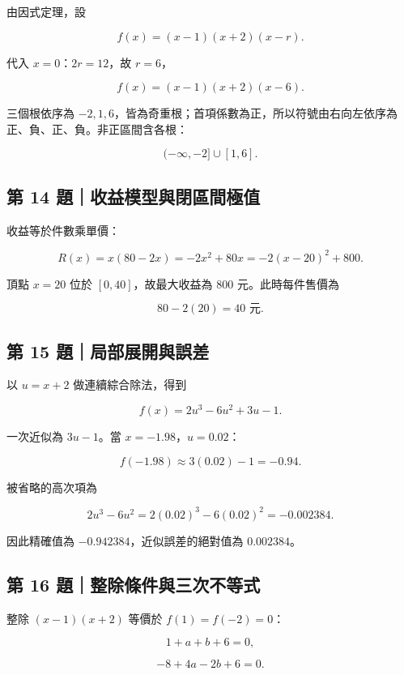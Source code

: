 \documentclass[11pt,a4paper]{article}
\begin{document}
由因式定理，設

\[
f(x)=(x-1)(x+2)(x-r).
\]

代入 \(x=0\)：\(2r=12\)，故 \(r=6\)，

\[
\boxed{f(x)=(x-1)(x+2)(x-6)}.
\]

三個根依序為 \(-2,1,6\)，皆為奇重根；首項係數為正，所以符號由右向左依序為正、負、正、負。非正區間含各根：

\[
\boxed{(-\infty,-2]\cup[1,6]}.
\]

\subsection{第 14 題｜收益模型與閉區間極值}\label{ux7b2c-14-ux984cux6536ux76caux6a21ux578bux8207ux9589ux5340ux9593ux6975ux503c}

收益等於件數乘單價：

\[
R(x)=x(80-2x)=-2x^2+80x=-2(x-20)^2+800.
\]

頂點 \(x=20\) 位於 \([0,40]\)，故最大收益為 \(\boxed{800}\) 元。此時每件售價為

\[
80-2(20)=\boxed{40}\text{ 元}.
\]

\subsection{第 15 題｜局部展開與誤差}\label{ux7b2c-15-ux984cux5c40ux90e8ux5c55ux958bux8207ux8aa4ux5dee}

以 \(u=x+2\) 做連續綜合除法，得到

\[
f(x)=2u^3-6u^2+3u-1.
\]

一次近似為 \(3u-1\)。當 \(x=-1.98\)，\(u=0.02\)：

\[
f(-1.98)\approx3(0.02)-1=\boxed{-0.94}.
\]

被省略的高次項為

\[
2u^3-6u^2=2(0.02)^3-6(0.02)^2=-0.002384.
\]

因此精確值為 \(-0.942384\)，近似誤差的絕對值為 \(\boxed{0.002384}\)。

\subsection{第 16 題｜整除條件與三次不等式}\label{ux7b2c-16-ux984cux6574ux9664ux689dux4ef6ux8207ux4e09ux6b21ux4e0dux7b49ux5f0f}

整除 \((x-1)(x+2)\) 等價於 \(f(1)=f(-2)=0\)：

\[
1+a+b+6=0,
\]

\[
-8+4a-2b+6=0.
\]
\end{document}

